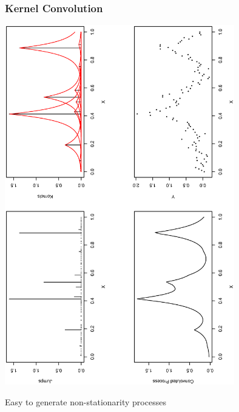 \documentclass[handout]{beamer}
\newcommand{\bs}[2]{\begin{frame} \frametitle{#1}
{#2}
\end{frame} }
\begin{document}
\bs{Kernel Convolution } {
    \includegraphics[angle=270,origin=l,totalheight=6truecm,
     clip=1, width=10cm]{gammaproc2.ps}

Easy to generate  non-stationarity processes

}
\end{document}
